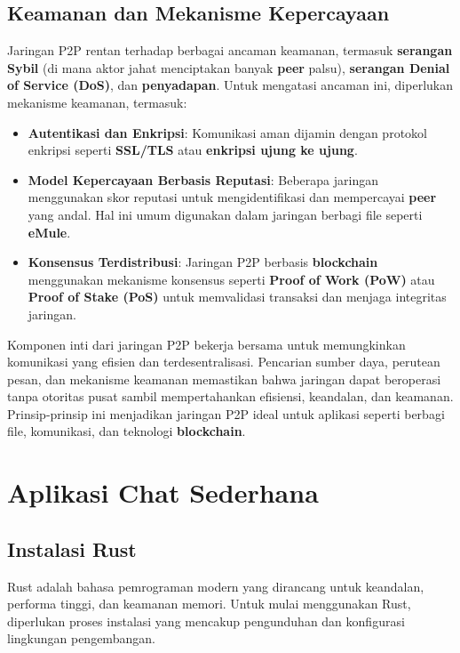 \subsection{Keamanan dan Mekanisme Kepercayaan}
Jaringan P2P rentan terhadap berbagai ancaman keamanan, termasuk \textbf{serangan Sybil} (di mana aktor jahat menciptakan banyak \textbf{peer} palsu), \textbf{serangan Denial of Service (DoS)}, dan \textbf{penyadapan}. Untuk mengatasi ancaman ini, diperlukan mekanisme keamanan, termasuk:
\begin{itemize}
	\item \textbf{Autentikasi dan Enkripsi}: Komunikasi aman dijamin dengan protokol enkripsi seperti \textbf{SSL/TLS} atau \textbf{enkripsi ujung ke ujung}.
	\item \textbf{Model Kepercayaan Berbasis Reputasi}: Beberapa jaringan menggunakan skor reputasi untuk mengidentifikasi dan mempercayai \textbf{peer} yang andal. Hal ini umum digunakan dalam jaringan berbagi file seperti \textbf{eMule}.
	\item \textbf{Konsensus Terdistribusi}: Jaringan P2P berbasis \textbf{blockchain} menggunakan mekanisme konsensus seperti \textbf{Proof of Work (PoW)} atau \textbf{Proof of Stake (PoS)} untuk memvalidasi transaksi dan menjaga integritas jaringan.
\end{itemize}

Komponen inti dari jaringan P2P bekerja bersama untuk memungkinkan komunikasi yang efisien dan terdesentralisasi. Pencarian sumber daya, perutean pesan, dan mekanisme keamanan memastikan bahwa jaringan dapat beroperasi tanpa otoritas pusat sambil mempertahankan efisiensi, keandalan, dan keamanan. Prinsip-prinsip ini menjadikan jaringan P2P ideal untuk aplikasi seperti berbagi file, komunikasi, dan teknologi \textbf{blockchain}.



\section{Aplikasi Chat Sederhana}


\subsection{Instalasi Rust}

Rust adalah bahasa pemrograman modern yang dirancang untuk keandalan, performa tinggi, dan keamanan memori. Untuk mulai menggunakan Rust, diperlukan proses instalasi yang mencakup pengunduhan dan konfigurasi lingkungan pengembangan.

